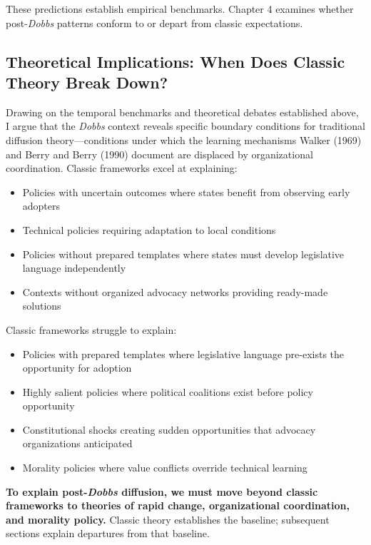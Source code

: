These predictions establish empirical benchmarks. Chapter 4 examines whether post-\emph{Dobbs} patterns conform to or depart from classic expectations.

\subsection{Theoretical Implications: When Does Classic Theory Break Down?}

Drawing on the temporal benchmarks and theoretical debates established above, I argue that the \textit{Dobbs} context reveals specific boundary conditions for traditional diffusion theory---conditions under which the learning mechanisms Walker (1969) and Berry and Berry (1990) document are displaced by organizational coordination. Classic frameworks excel at explaining:

\begin{itemize}
\item Policies with uncertain outcomes where states benefit from observing early adopters
\item Technical policies requiring adaptation to local conditions
\item Policies without prepared templates where states must develop legislative language independently
\item Contexts without organized advocacy networks providing ready-made solutions
\end{itemize}

Classic frameworks struggle to explain:

\begin{itemize}
\item Policies with prepared templates where legislative language pre-exists the opportunity for adoption
\item Highly salient policies where political coalitions exist before policy opportunity
\item Constitutional shocks creating sudden opportunities that advocacy organizations anticipated
\item Morality policies where value conflicts override technical learning
\end{itemize}

\textbf{To explain post-\emph{Dobbs} diffusion, we must move beyond classic frameworks to theories of rapid change, organizational coordination, and morality policy.} Classic theory establishes the baseline; subsequent sections explain departures from that baseline.


